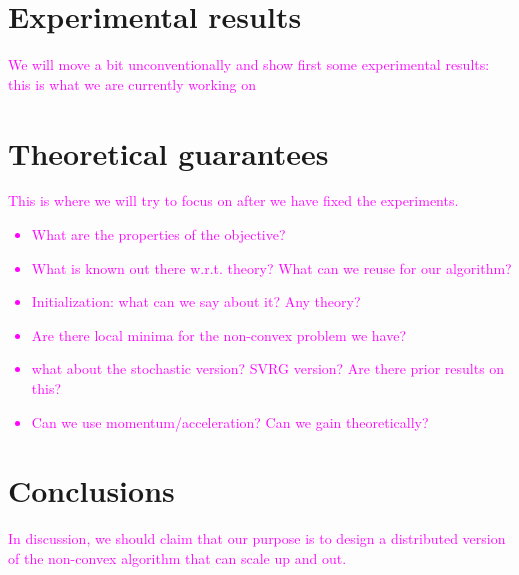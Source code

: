 \documentclass[letterpaper]{article} %
\begin{document}
\section{Experimental results}
\textcolor{magenta}{We will move a bit unconventionally and show first some experimental results: this is what we are currently working on}

\section{Theoretical guarantees}
\textcolor{magenta}{This is where we will try to focus on after we have fixed the experiments. 
\begin{itemize}
\item What are the properties of the objective?
\item What is known out there w.r.t. theory? What can we reuse for our algorithm?
\item Initialization: what can we say about it? Any theory?
\item Are there local minima for the non-convex problem we have?
\item what about the stochastic version? SVRG version? Are there prior results on this?
\item Can we use momentum/acceleration? Can we gain theoretically?
\end{itemize}}

\section{Conclusions}
\textcolor{magenta}{In discussion, we should claim that our purpose is to design a distributed version of the non-convex algorithm that can scale up and out.}


\end{document}
